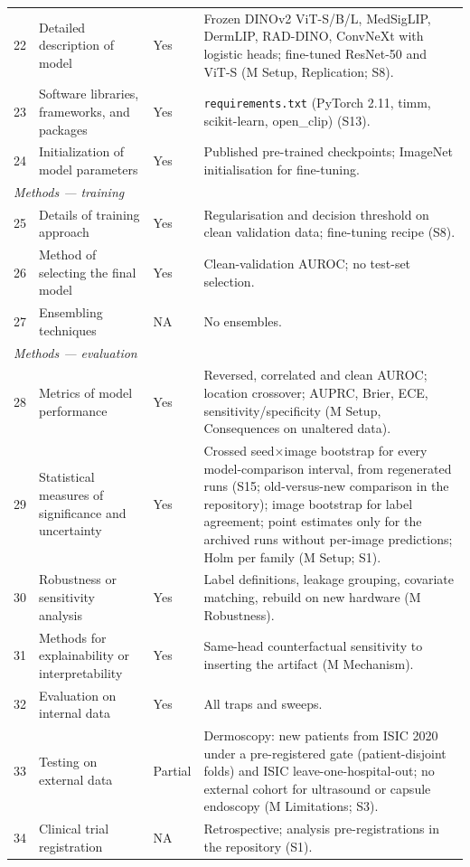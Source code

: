 {\begin{longtable}{p{0.4cm}p{6.2cm}p{0.9cm}p{7.3cm}}
22 & Detailed description of model & Yes & Frozen DINOv2 ViT-S/B/L, MedSigLIP, DermLIP, RAD-DINO, ConvNeXt with logistic heads; fine-tuned ResNet-50 and ViT-S (M Setup, Replication; S8). \\
23 & Software libraries, frameworks, and packages & Yes & \texttt{requirements.txt} (PyTorch 2.11, timm, scikit-learn, open\_clip) (S13). \\
24 & Initialization of model parameters & Yes & Published pre-trained checkpoints; ImageNet initialisation for fine-tuning. \\
\multicolumn{4}{l}{\emph{Methods --- training}}\\
25 & Details of training approach & Yes & Regularisation and decision threshold on clean validation data; fine-tuning recipe (S8). \\
26 & Method of selecting the final model & Yes & Clean-validation AUROC; no test-set selection. \\
27 & Ensembling techniques & NA & No ensembles. \\
\multicolumn{4}{l}{\emph{Methods --- evaluation}}\\
28 & Metrics of model performance & Yes & Reversed, correlated and clean AUROC; location crossover; AUPRC, Brier, ECE, sensitivity/specificity (M Setup, Consequences on unaltered data). \\
29 & Statistical measures of significance and uncertainty & Yes & Crossed seed$\times$image bootstrap for every model-comparison interval, from regenerated runs (S15; old-versus-new comparison in the repository); image bootstrap for label agreement; point estimates only for the archived runs without per-image predictions; Holm per family (M Setup; S1). \\
30 & Robustness or sensitivity analysis & Yes & Label definitions, leakage grouping, covariate matching, rebuild on new hardware (M Robustness). \\
31 & Methods for explainability or interpretability & Yes & Same-head counterfactual sensitivity to inserting the artifact (M Mechanism). \\
32 & Evaluation on internal data & Yes & All traps and sweeps. \\
33 & Testing on external data & Partial & Dermoscopy: new patients from ISIC 2020 under a pre-registered gate (patient-disjoint folds) and ISIC leave-one-hospital-out; no external cohort for ultrasound or capsule endoscopy (M Limitations; S3). \\
34 & Clinical trial registration & NA & Retrospective; analysis pre-registrations in the repository (S1). \\

\end{longtable}}
